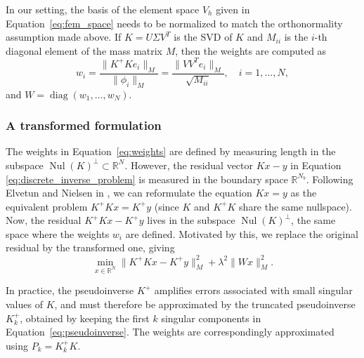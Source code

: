 In our setting, the basis of the element space $V_h$ given in Equation~\eqref{eq:fem_space} needs to be normalized to match the orthonormality assumption made above. If $K = U\Sigma V^T$ is the SVD of $K$ and $M_{ii}$ is the $i$-th diagonal element of the mass matrix $M$, then the weights are computed as 
\begin{equation}\label{eq:weights}
    w_i =
    \frac{\| K^+ K e_i \|_M}
         {\| \phi_i \|_M} =
    \frac{\| V V^T e_i \|_M}
         {\sqrt{M_{ii}}},
    \quad i = 1, \dots, N,
\end{equation}
and $W = \operatorname{diag}(w_1, \dots, w_N)$.


\subsubsection{A transformed formulation}
The weights in Equation~\eqref{eq:weights} are defined by measuring length in the subspace $\operatorname{Nul}(K)^\perp \subset \mathbb{R}^N$. However, the residual vector $K x - y$ in Equation \eqref{eq:discrete_inverse_problem} is measured in the boundary space $\mathbb{R}^{N_b}$. Following Elvetun and Nielsen in \cite{elvetunWeightedSparsityRegularization2023}, we can reformulate the equation $K x = y$ as the equivalent problem $K^+ K x = K^+ y$ (since $K$ and $K^+K$ share the same nullspace). Now, the residual $K^+ K x - K^+ y$ lives in the subspace $\operatorname{Nul}(K)^\perp$, the same space where the weights $w_i$ are defined. Motivated by this, we replace the original residual by the transformed one, giving
\begin{equation}\label{eq:transformed_discrete_inverse_problem}
    \min_{x \in \mathbb{R}^N}
    \| K^+ K x - K^+ y \|_{M}^2
    + \lambda^2 \| W x \|_M^2.
\end{equation}

In practice, the pseudoinverse $K^+$ amplifies errors associated with small singular values of $K$, and must therefore be approximated by the truncated pseudoinverse $K_k^+$, obtained by keeping the first $k$ singular components in Equation~\eqref{eq:pseudoinverse}. The weights are correspondingly approximated using $P_k = K_k^+ K$.
